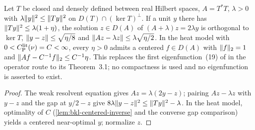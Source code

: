 \begin{lemma}
  \label{lem:bkl-approximate-eigenfunction}
  \leanok
  Let $T$ be closed and densely defined between real Hilbert spaces, $A=T^*T$, $\lambda>0$ with
  $\lambda\lVert y\rVert^2\le\lVert Ty\rVert^2$ on $D(T)\cap(\ker T)^\perp$.  If a unit $y$ there has
  $\lVert Ty\rVert^2\le\lambda(1+\eta)$, the solution $z\in D(A)$ of $(A+\lambda)z=2\lambda y$ is orthogonal to
  $\ker T$, $\lVert y-z\rVert\le\sqrt{\eta/8}$ and $\lVert Az-\lambda z\rVert\le\lambda\sqrt{\eta/2}$.  In the heat
  model with $0<C_{\mathrm P}^{\mathrm{lit}}(\nu)=C<\infty$, every $\eta>0$ admits a centered $f\in D(A)$ with $\lVert f\rVert_2=1$ and
  $\lVert Af-C^{-1}f\rVert_2\le C^{-1}\eta$.  This replaces the first eigenfunction~(19) of
  \cite{BizeulKlartagLehec2026} in the operator route to its Theorem~3.1; no compactness is used and no
  eigenfunction is asserted to exist.
\end{lemma}
\begin{proof}
  \leanok
  The weak resolvent equation gives $Az=\lambda(2y-z)$; pairing $Az-\lambda z$ with $y-z$ and the gap at
  $y/2-z$ give $8\lambda\lVert y-z\rVert^2\le\lVert Ty\rVert^2-\lambda$.  In the heat model, optimality of $C$
  (\cref{lem:bkl-centered-inverse} and the converse gap comparison) yields a centered near-optimal $y$;
  normalize $z$.
\end{proof}

